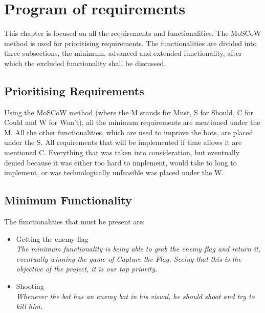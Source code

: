 \chapter{Program of requirements}
This chapter is focused on all the requirements and functionalities. The MoSCoW method is used for prioritising requirements. The functionalities are divided into three subsections, the minimum, advanced and extended functionality, after which the excluded functionality shall be discussed.
\section{Prioritising Requirements}
Using the MoSCoW method (where the M stands for Must, S for Should, C for Could and W for Won't), all the minimum requirements are mentioned under the M. All the other functionalities, which are used to improve the bots, are placed under the S. All requirements that will be implemented if time allows it are mentioned C. Everything that was taken into consideration, but eventually denied because it was either too hard to implement, would take to long to implement, or was technologically unfeasible was placed under the W.\\


\section{Minimum Functionality}
The functionalities that must be present are:
\begin{itemize}
	\item Getting the enemy flag \\
		\textit{The minimum functionality is being able to grab the enemy flag and return it, eventually winning the game of Capture the Flag. Seeing that this is the objective of the project, it is our top priority.}
	\item Shooting \\
		\textit{Whenever the bot has an enemy bot in his visual, he should shoot and try to kill him.}
\end{itemize}

